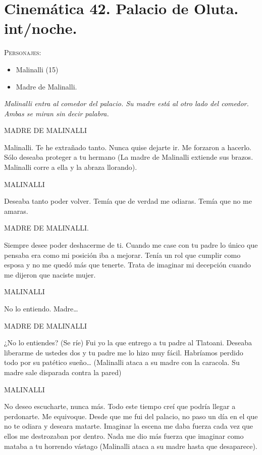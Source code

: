 \documentclass[11pt,letterpaper]{article}
\begin{document}
\section{Cinemática 42. Palacio de Oluta. int/noche. }
 \textsc{Personajes}:
 \begin{itemize}
 \item Malinalli (15)
 \item Madre de Malinalli.
 \end{itemize}
\textit{Malinalli entra al comedor del palacio. Su madre está al otro lado del comedor. Ambas se miran sin decir palabra. }
\begin{center}
MADRE DE MALINALLI
\\
\par
Malinalli. Te he extrañado tanto. Nunca quise dejarte ir. Me forzaron a hacerlo. Sólo deseaba proteger a tu hermano (La madre de Malinalli extiende sus brazos. Malinalli corre a ella y la abraza llorando).
\\
\par
MALINALLI
\\
\par
Deseaba tanto poder volver. Temía que de verdad me odiaras. Temía que no me amaras.
\\
\par
MADRE DE MALINALLI.
\\
\par
Siempre desee poder deshacerme de ti. Cuando me case con tu padre lo único que pensaba era como mi posición iba a mejorar. Tenía un rol que cumplir como esposa y no me quedó más que tenerte. Trata de imaginar mi decepción cuando me dijeron que naciste mujer. 
\\
\par
MALINALLI
\\
\par
No lo entiendo. Madre…
\\
\par
MADRE DE MALINALLI
\\
\par
¿No lo entiendes? (Se ríe) Fui yo la que entrego a tu padre al Tlatoani. Deseaba liberarme de ustedes dos y tu padre me lo hizo muy fácil. Habríamos perdido todo por su patético sueño… (Malinalli ataca a su madre con la caracola. Su madre sale disparada contra la pared)
\\
\par
MALINALLI
\\
\par
No deseo escucharte, nunca más. Todo este tiempo creí que podría llegar a perdonarte. Me equivoque. Desde que me fui del palacio, no paso un día en el que no te odiara y deseara matarte. Imaginar la escena me daba fuerza cada vez que ellos me destrozaban por dentro. Nada me dio más fuerza que imaginar como mataba a tu horrendo vástago (Malinalli ataca a su madre hasta que desaparece).   
\end{center}
\end{document}
